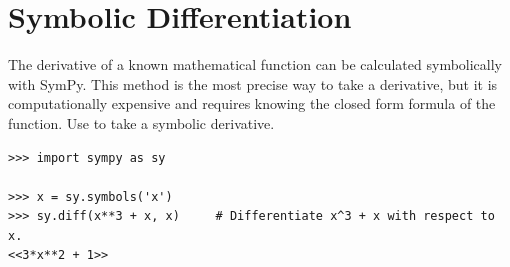 \label{lab:Derivatives}

\section*{Symbolic Differentiation} %

The derivative of a known mathematical function can be calculated symbolically with SymPy.
This method is the most precise way to take a derivative, but it is computationally expensive and requires knowing the closed form formula of the function.
Use  to take a symbolic derivative.

\begin{lstlisting}
>>> import sympy as sy

>>> x = sy.symbols('x')
>>> sy.diff(x**3 + x, x)     # Differentiate x^3 + x with respect to x.
<<3*x**2 + 1>>
\end{lstlisting}

